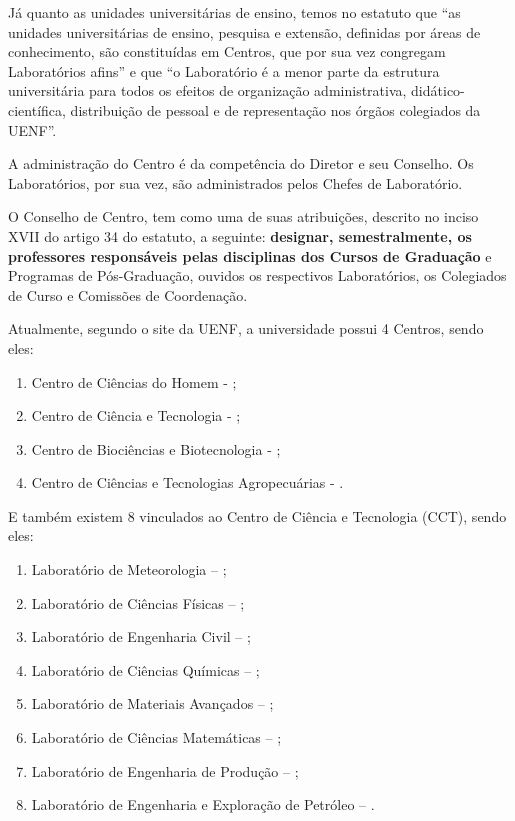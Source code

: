 Já quanto as unidades universitárias de ensino, temos no estatuto que ``as unidades universitárias de ensino, pesquisa e extensão, definidas por áreas de conhecimento, são constituídas em Centros, que por sua vez congregam Laboratórios afins'' e que ``o Laboratório é a menor parte da estrutura universitária para todos os efeitos de organização administrativa, didático-científica, distribuição de pessoal e de representação nos órgãos colegiados da UENF''.

A administração do Centro é da competência do Diretor e seu Conselho. Os Laboratórios, por sua vez, são administrados pelos Chefes de Laboratório.

O Conselho de Centro, tem como uma de suas atribuições, descrito no inciso XVII do artigo 34 do estatuto, a seguinte: \textbf{designar, semestralmente, os professores responsáveis pelas disciplinas dos Cursos de Graduação} e Programas de Pós-Graduação, ouvidos os respectivos Laboratórios, os Colegiados de Curso e Comissões de Coordenação.

Atualmente, segundo o site da UENF, a universidade possui 4 Centros, sendo eles:

\begin{enumerate}
  \item Centro de Ciências do Homem - ;
  \item Centro de Ciência e Tecnologia - ;
  \item Centro de Biociências e Biotecnologia - ;
  \item Centro de Ciências e Tecnologias Agropecuárias - .
\end{enumerate}

E também existem 8  vinculados ao Centro de Ciência e Tecnologia (CCT), sendo eles:

\begin{enumerate}
  \item Laboratório de Meteorologia – ;
  \item Laboratório de Ciências Físicas – ;
  \item Laboratório de Engenharia Civil – ;
  \item Laboratório de Ciências Químicas – ;
  \item Laboratório de Materiais Avançados – ;
  \item Laboratório de Ciências Matemáticas – ;
  \item Laboratório de Engenharia de Produção – ;
  \item Laboratório de Engenharia e Exploração de Petróleo – .
\end{enumerate}


